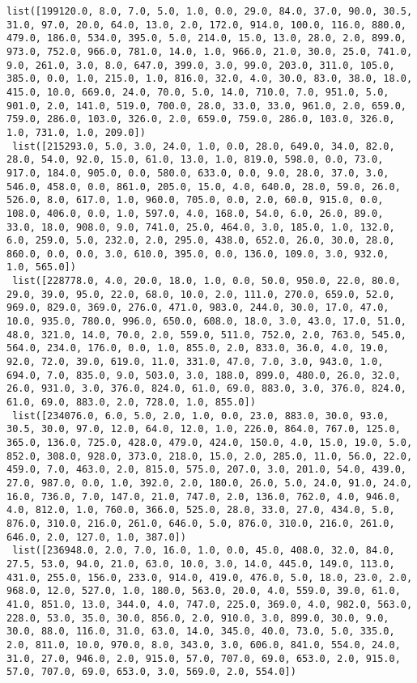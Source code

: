 \documentclass[11pt]{article}
\begin{document}
\begin{Verbatim}[commandchars=\\\{\}]
 list([199120.0, 8.0, 7.0, 5.0, 1.0, 0.0, 29.0, 84.0, 37.0, 90.0, 30.5, 31.0, 97.0, 20.0, 64.0, 13.0, 2.0, 172.0, 914.0, 100.0, 116.0, 880.0, 479.0, 186.0, 534.0, 395.0, 5.0, 214.0, 15.0, 13.0, 28.0, 2.0, 899.0, 973.0, 752.0, 966.0, 781.0, 14.0, 1.0, 966.0, 21.0, 30.0, 25.0, 741.0, 9.0, 261.0, 3.0, 8.0, 647.0, 399.0, 3.0, 99.0, 203.0, 311.0, 105.0, 385.0, 0.0, 1.0, 215.0, 1.0, 816.0, 32.0, 4.0, 30.0, 83.0, 38.0, 18.0, 415.0, 10.0, 669.0, 24.0, 70.0, 5.0, 14.0, 710.0, 7.0, 951.0, 5.0, 901.0, 2.0, 141.0, 519.0, 700.0, 28.0, 33.0, 33.0, 961.0, 2.0, 659.0, 759.0, 286.0, 103.0, 326.0, 2.0, 659.0, 759.0, 286.0, 103.0, 326.0, 1.0, 731.0, 1.0, 209.0])
 list([215293.0, 5.0, 3.0, 24.0, 1.0, 0.0, 28.0, 649.0, 34.0, 82.0, 28.0, 54.0, 92.0, 15.0, 61.0, 13.0, 1.0, 819.0, 598.0, 0.0, 73.0, 917.0, 184.0, 905.0, 0.0, 580.0, 633.0, 0.0, 9.0, 28.0, 37.0, 3.0, 546.0, 458.0, 0.0, 861.0, 205.0, 15.0, 4.0, 640.0, 28.0, 59.0, 26.0, 526.0, 8.0, 617.0, 1.0, 960.0, 705.0, 0.0, 2.0, 60.0, 915.0, 0.0, 108.0, 406.0, 0.0, 1.0, 597.0, 4.0, 168.0, 54.0, 6.0, 26.0, 89.0, 33.0, 18.0, 908.0, 9.0, 741.0, 25.0, 464.0, 3.0, 185.0, 1.0, 132.0, 6.0, 259.0, 5.0, 232.0, 2.0, 295.0, 438.0, 652.0, 26.0, 30.0, 28.0, 860.0, 0.0, 0.0, 3.0, 610.0, 395.0, 0.0, 136.0, 109.0, 3.0, 932.0, 1.0, 565.0])
 list([228778.0, 4.0, 20.0, 18.0, 1.0, 0.0, 50.0, 950.0, 22.0, 80.0, 29.0, 39.0, 95.0, 22.0, 68.0, 10.0, 2.0, 111.0, 270.0, 659.0, 52.0, 969.0, 829.0, 369.0, 276.0, 471.0, 983.0, 244.0, 30.0, 17.0, 47.0, 10.0, 935.0, 780.0, 996.0, 650.0, 608.0, 18.0, 3.0, 43.0, 17.0, 51.0, 48.0, 321.0, 14.0, 70.0, 2.0, 559.0, 511.0, 752.0, 2.0, 763.0, 545.0, 564.0, 234.0, 176.0, 0.0, 1.0, 855.0, 2.0, 833.0, 36.0, 4.0, 19.0, 92.0, 72.0, 39.0, 619.0, 11.0, 331.0, 47.0, 7.0, 3.0, 943.0, 1.0, 694.0, 7.0, 835.0, 9.0, 503.0, 3.0, 188.0, 899.0, 480.0, 26.0, 32.0, 26.0, 931.0, 3.0, 376.0, 824.0, 61.0, 69.0, 883.0, 3.0, 376.0, 824.0, 61.0, 69.0, 883.0, 2.0, 728.0, 1.0, 855.0])
 list([234076.0, 6.0, 5.0, 2.0, 1.0, 0.0, 23.0, 883.0, 30.0, 93.0, 30.5, 30.0, 97.0, 12.0, 64.0, 12.0, 1.0, 226.0, 864.0, 767.0, 125.0, 365.0, 136.0, 725.0, 428.0, 479.0, 424.0, 150.0, 4.0, 15.0, 19.0, 5.0, 852.0, 308.0, 928.0, 373.0, 218.0, 15.0, 2.0, 285.0, 11.0, 56.0, 22.0, 459.0, 7.0, 463.0, 2.0, 815.0, 575.0, 207.0, 3.0, 201.0, 54.0, 439.0, 27.0, 987.0, 0.0, 1.0, 392.0, 2.0, 180.0, 26.0, 5.0, 24.0, 91.0, 24.0, 16.0, 736.0, 7.0, 147.0, 21.0, 747.0, 2.0, 136.0, 762.0, 4.0, 946.0, 4.0, 812.0, 1.0, 760.0, 366.0, 525.0, 28.0, 33.0, 27.0, 434.0, 5.0, 876.0, 310.0, 216.0, 261.0, 646.0, 5.0, 876.0, 310.0, 216.0, 261.0, 646.0, 2.0, 127.0, 1.0, 387.0])
 list([236948.0, 2.0, 7.0, 16.0, 1.0, 0.0, 45.0, 408.0, 32.0, 84.0, 27.5, 53.0, 94.0, 21.0, 63.0, 10.0, 3.0, 14.0, 445.0, 149.0, 113.0, 431.0, 255.0, 156.0, 233.0, 914.0, 419.0, 476.0, 5.0, 18.0, 23.0, 2.0, 968.0, 12.0, 527.0, 1.0, 180.0, 563.0, 20.0, 4.0, 559.0, 39.0, 61.0, 41.0, 851.0, 13.0, 344.0, 4.0, 747.0, 225.0, 369.0, 4.0, 982.0, 563.0, 228.0, 53.0, 35.0, 30.0, 856.0, 2.0, 910.0, 3.0, 899.0, 30.0, 9.0, 30.0, 88.0, 116.0, 31.0, 63.0, 14.0, 345.0, 40.0, 73.0, 5.0, 335.0, 2.0, 811.0, 10.0, 970.0, 8.0, 343.0, 3.0, 606.0, 841.0, 554.0, 24.0, 31.0, 27.0, 946.0, 2.0, 915.0, 57.0, 707.0, 69.0, 653.0, 2.0, 915.0, 57.0, 707.0, 69.0, 653.0, 3.0, 569.0, 2.0, 554.0])

\end{Verbatim}
\end{document}
